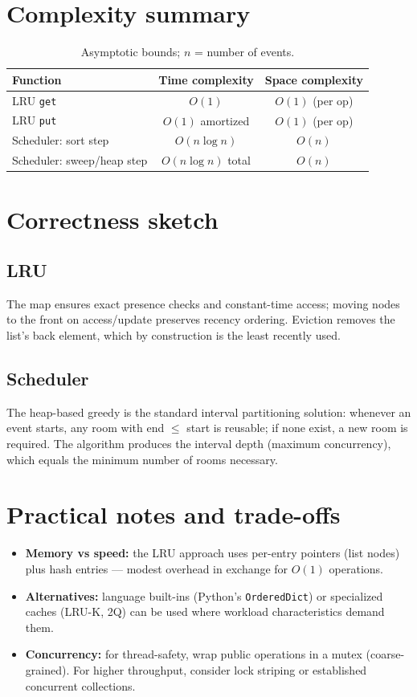 \documentclass[11pt,a4paper]{article}
\begin{document}
\section{Complexity summary}
\begin{table}[h!]
\centering
\begin{tabular}{@{}lcc@{}}
\toprule
Function & Time complexity & Space complexity \\ \midrule
LRU \texttt{get} & \(O(1)\) & \(O(1)\) (per op) \\
LRU \texttt{put} & \(O(1)\) amortized & \(O(1)\) (per op) \\
Scheduler: sort step & \(O(n\log n)\) & \(O(n)\) \\
Scheduler: sweep/heap step & \(O(n\log n)\) total & \(O(n)\) \\ \bottomrule
\end{tabular}
\caption{Asymptotic bounds; \(n\) = number of events.}
\end{table}

\section{Correctness sketch}
\subsection{LRU}
The map ensures exact presence checks and constant-time access; moving nodes to the front on access/update preserves recency ordering. Eviction removes the list's back element, which by construction is the least recently used.

\subsection{Scheduler}
The heap-based greedy is the standard interval partitioning solution: whenever an event starts, any room with end $\le$ start is reusable; if none exist, a new room is required. The algorithm produces the interval depth (maximum concurrency), which equals the minimum number of rooms necessary.

\section{Practical notes and trade-offs}
\begin{itemize}
  \item \textbf{Memory vs speed:} the LRU approach uses per-entry pointers (list nodes) plus hash entries — modest overhead in exchange for \(O(1)\) operations.
  \item \textbf{Alternatives:} language built-ins (Python's \texttt{OrderedDict}) or specialized caches (LRU-K, 2Q) can be used where workload characteristics demand them.
  \item \textbf{Concurrency:} for thread-safety, wrap public operations in a mutex (coarse-grained). For higher throughput, consider lock striping or established concurrent collections.
\end{itemize}
\end{document}
